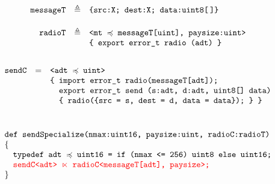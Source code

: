 $$
\begin{array}{rcl}
\texttt{messageT} &\triangleq& \texttt{\{src:X; dest:X; data:uint8[\,]\}} \\[5mm]
\texttt{radioT} &\triangleq& \texttt{<mt $\preccurlyeq$ messageT[uint], paysize:uint>} \\
 & & \texttt{\{\ export\  error\_t\ radio (adt)\ \}}\\[5mm]
\end{array} 
$$
$$
\begin{array}{lcl}
\texttt{sendC} & = & \texttt{<adt $\subtype$ uint>}\\
&& \texttt{\{ import error\_t radio(messageT[adt]);}\\
&& \texttt{\phantom{\{ }export error\_t send (s:adt, d:adt, uint8[] data)}\\
&& \texttt{\phantom{\{ }\{ radio(\{src = s, dest = d, data = data\}); \}\ \}}\\[10mm]
\multicolumn{3}{l}{\texttt{def sendSpecialize(nmax:uint16, paysize:uint, radioC:radioT)}}\\
\{\\
\multicolumn{3}{l}{\quad \texttt{typedef adt $\subtype$ uint16 = if (nmax <= 256) uint8 else uint16;}}\\
\multicolumn{3}{l}{\quad \texttt{\color{red}{sendC<adt> $\ltimes$ radioC<messageT[adt], paysize>;}}}\\
\}
\end{array}
$$

\stopslide


